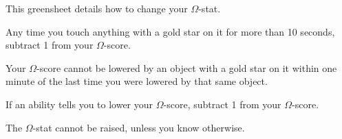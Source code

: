 \documentclass[green]{guildcamp1}
\begin{document}
\name{\gVirus{}}

This greensheet details how to change your $\Omega$-stat.

\begin{enum}[lowering]
  \item Any time you touch anything with a gold star  on it for more than 10 seconds, subtract 1 from your $\Omega$-score.
  \item Your $\Omega$-score cannot be lowered by an object with a gold star on it within one minute of the last time you were lowered by that same object.
  \item If an ability tells you to lower your $\Omega$-score, subtract 1 from your $\Omega$-score.

\end{enum}

The $\Omega$-stat cannot be raised, unless you know otherwise.
\end{document}
